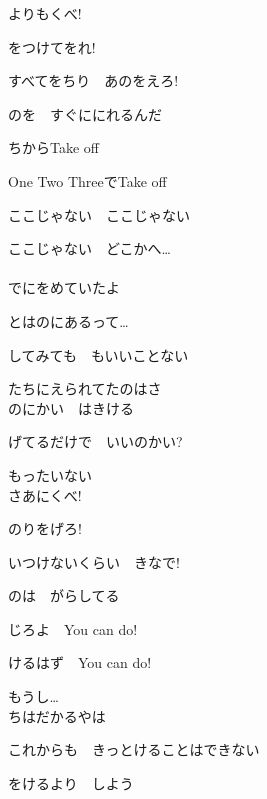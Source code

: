 よりもくべ!

をつけてをれ!

すべてをちり　あのをえろ!

のを　すぐににれるんだ

ちからTake off

One Two ThreeでTake off

ここじゃない　ここじゃない

ここじゃない　どこかへ…
\\
\\

でにをめていたよ

とはのにあるって…

してみても　もいいことない

たちにえられてたのはさ
\\

のにかい　はきける

げてるだけで　いいのかい?

もったいない
\\

さあにくべ!

のりをげろ!

いつけないくらい　きなで!

のは　がらしてる

じろよ　You can do!

けるはず　You can do!

もうし…
\\

ちはだかるやは

これからも　きっとけることはできない

をけるより　しよう

